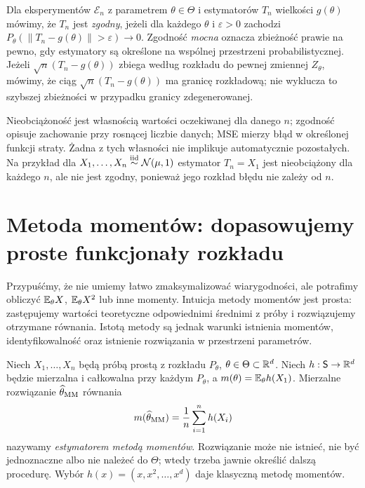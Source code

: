 \begin{definicja}\label{def:est-consistency}
Dla eksperymentów $\mathcal E_n$ z parametrem $\theta\in\Theta$
i estymatorów $T_n$ wielkości $g(\theta)$ mówimy, że
$T_n$ jest \emph{zgodny}, jeżeli dla każdego $\theta$ i $\varepsilon>0$
zachodzi $P_\theta(\|T_n-g(\theta)\|>\varepsilon)\to0$.
Zgodność \emph{mocna} oznacza zbieżność prawie na pewno, gdy
estymatory są określone na wspólnej przestrzeni probabilistycznej.
Jeżeli $\sqrt n(T_n-g(\theta))$ zbiega według rozkładu do pewnej
zmiennej $Z_\theta$, mówimy, że ciąg $\sqrt n(T_n-g(\theta))$ ma granicę rozkładową; nie wyklucza to szybszej zbieżności w przypadku granicy zdegenerowanej.
\end{definicja}

Nieobciążoność jest własnością wartości oczekiwanej dla danego $n$;
zgodność opisuje zachowanie przy rosnącej liczbie danych; MSE
mierzy błąd w określonej funkcji straty. Żadna z tych własności
nie implikuje automatycznie pozostałych. Na przykład dla
$X_1,\ldots,X_n\mathrel{\overset{\mathrm{iid}}\sim}\mathcal N(\mu,1)$ estymator $T_n=X_1$
jest nieobciążony dla każdego $n$, ale nie jest zgodny, ponieważ
jego rozkład błędu nie zależy od $n$.

\section{Metoda momentów: dopasowujemy proste funkcjonały rozkładu}
\label{sec:moments-method}
Przypuśćmy, że nie umiemy łatwo zmaksymalizować wiarygodności,
ale potrafimy obliczyć $\mathbb E_\theta X$, $\mathbb E_\theta X^2$ lub inne
momenty. Intuicja metody momentów jest prosta: zastępujemy
wartości teoretyczne odpowiednimi średnimi z próby i rozwiązujemy
otrzymane równania. Istotą metody są jednak warunki istnienia momentów,
identyfikowalność oraz istnienie rozwiązania w przestrzeni parametrów.

\begin{definicja}\label{def:mom}
Niech $X_1,\ldots,X_n$ będą próbą prostą z rozkładu $P_\theta$,
$\theta\in\Theta\subset\mathbb R^d$. Niech
$h:\mathsf S\to\mathbb R^d$ będzie mierzalna i całkowalna przy każdym
$P_\theta$, a $m(\theta)=\mathbb E_\theta h(X_1)$.
Mierzalne rozwiązanie $\widehat\theta_{\rm MM}$ równania
\[
m(\widehat\theta_{\rm MM})=\frac1n\sum_{i=1}^n h(X_i)
\]
nazywamy \emph{estymatorem metodą momentów}.
Rozwiązanie może nie istnieć, nie być jednoznaczne albo nie należeć
do $\Theta$; wtedy trzeba jawnie określić dalszą procedurę.
Wybór $h(x)=(x,x^2,\ldots,x^d)$ daje klasyczną metodę momentów.
\end{definicja}

